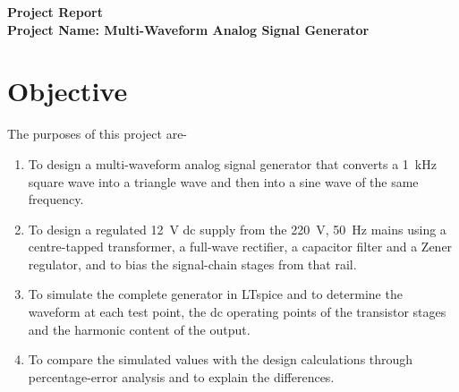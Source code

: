 \documentclass[12pt,a4paper]{article}
\begin{document}
	

	\begingroup
	\singlespacing
	\small
	\tableofcontents
	\endgroup
	\newpage

	\begin{center}
		{\large\bfseries Project Report}\\[4pt]
		{\large\bfseries Project Name: Multi-Waveform Analog Signal Generator}
	\end{center}
	\vspace{6pt}

	\section{Objective}
	The purposes of this project are-
	\begin{enumerate}[label=\arabic*.]
		\item To design a multi-waveform analog signal generator that converts a \SI{1}{\kilo\hertz} square wave into a triangle wave and then into a sine wave of the same frequency.
		\item To design a regulated \SI{12}{\volt} dc supply from the \SI{220}{\volt}, \SI{50}{\hertz} mains using a centre-tapped transformer, a full-wave rectifier, a capacitor filter and a Zener regulator, and to bias the signal-chain stages from that rail.
		\item To simulate the complete generator in LTspice and to determine the waveform at each test point, the dc operating points of the transistor stages and the harmonic content of the output.
		\item To compare the simulated values with the design calculations through percentage-error analysis and to explain the differences.
	\end{enumerate}

\end{document}
